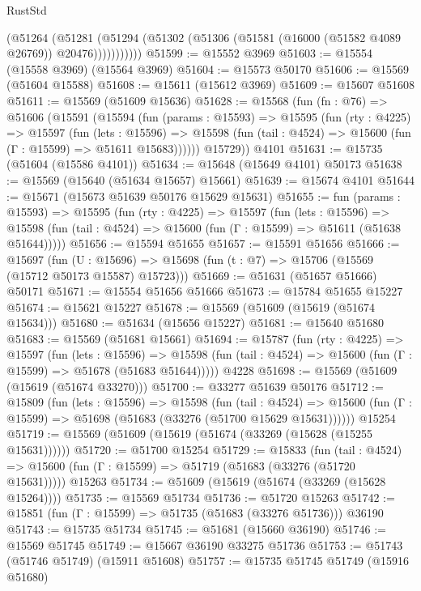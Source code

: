 \begin{lexlean}{RustStd}
\begin{coremodule}
              (@51264
                (@51281
                  (@51294 (@51302 (@51306 (@51581 (@16000 (@51582 @4089 @26769)) @20476)))))))))))
@51599 := @15552 @3969
@51603 := @15554 (@15558 @3969) (@15564 @3969)
@51604 := @15573 @50170
@51606 := @15569 (@51604 @15588)
@51608 := @15611 (@15612 @3969)
@51609 := @15607 @51608
@51611 := @15569 (@51609 @15636)
@51628 := @15568
    (fun (fn : @76) =>
    @51606
      (@15591
        (@15594
          (fun (params : @15593) =>
          @15595
            (fun (rty : @4225) =>
            @15597
              (fun (lets : @15596) =>
              @15598 (fun (tail : @4524) => @15600 (fun (Γ : @15599) => @51611 @15683))))))
        @15729))
    @4101
@51631 := @15735 (@51604 (@15586 @4101))
@51634 := @15648 (@15649 @4101) @50173
@51638 := @15569 (@15640 (@51634 @15657) @15661)
@51639 := @15674 @4101
@51644 := @15671 (@15673 @51639 @50176 @15629 @15631)
@51655 := fun (params : @15593) =>
  @15595
    (fun (rty : @4225) =>
    @15597
      (fun (lets : @15596) =>
      @15598 (fun (tail : @4524) => @15600 (fun (Γ : @15599) => @51611 (@51638 @51644)))))
@51656 := @15594 @51655
@51657 := @15591 @51656
@51666 := @15697
    (fun (U : @15696) => @15698 (fun (t : @7) => @15706 (@15569 (@15712 @50173 @15587) @15723)))
@51669 := @51631 (@51657 @51666) @50171
@51671 := @15554 @51656 @51666
@51673 := @15784 @51655 @15227
@51674 := @15621 @15227
@51678 := @15569 (@51609 (@15619 (@51674 @15634)))
@51680 := @51634 (@15656 @15227)
@51681 := @15640 @51680
@51683 := @15569 (@51681 @15661)
@51694 := @15787
    (fun (rty : @4225) =>
    @15597
      (fun (lets : @15596) =>
      @15598 (fun (tail : @4524) => @15600 (fun (Γ : @15599) => @51678 (@51683 @51644)))))
    @4228
@51698 := @15569 (@51609 (@15619 (@51674 @33270)))
@51700 := @33277 @51639 @50176
@51712 := @15809
    (fun (lets : @15596) =>
    @15598
      (fun (tail : @4524) =>
      @15600 (fun (Γ : @15599) => @51698 (@51683 (@33276 (@51700 @15629 @15631))))))
    @15254
@51719 := @15569 (@51609 (@15619 (@51674 (@33269 (@15628 (@15255 @15631))))))
@51720 := @51700 @15254
@51729 := @15833
    (fun (tail : @4524) => @15600 (fun (Γ : @15599) => @51719 (@51683 (@33276 (@51720 @15631)))))
    @15263
@51734 := @51609 (@15619 (@51674 (@33269 (@15628 @15264))))
@51735 := @15569 @51734
@51736 := @51720 @15263
@51742 := @15851 (fun (Γ : @15599) => @51735 (@51683 (@33276 @51736))) @36190
@51743 := @15735 @51734
@51745 := @51681 (@15660 @36190)
@51746 := @15569 @51745
@51749 := @15667 @36190 @33275 @51736
@51753 := @51743 (@51746 @51749) (@15911 @51608)
@51757 := @15735 @51745 @51749 (@15916 @51680)

\end{coremodule}
\end{lexlean}
